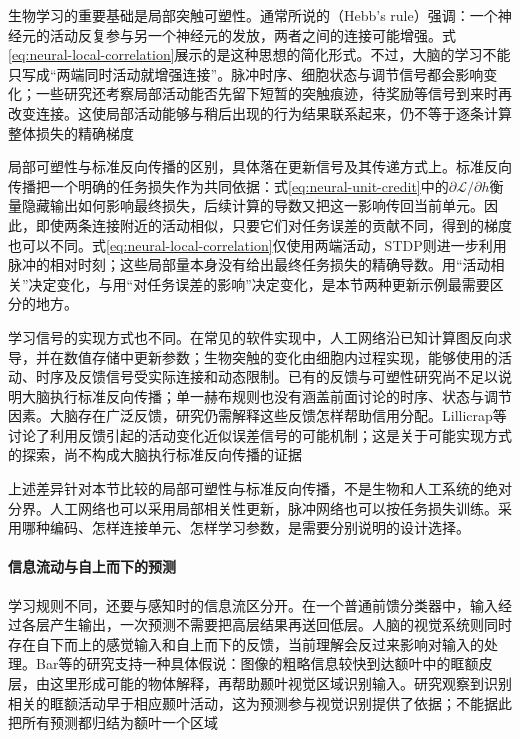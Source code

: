 生物学习的重要基础是局部突触可塑性。通常所说的（Hebb's rule）强调：一个神经元的活动反复参与另一个神经元的发放，两者之间的连接可能增强。式\eqref{eq:neural-local-correlation}展示的是这种思想的简化形式。不过，大脑的学习不能只写成“两端同时活动就增强连接”。脉冲时序、细胞状态与调节信号都会影响变化；一些研究还考察局部活动能否先留下短暂的突触痕迹，待奖励等信号到来时再改变连接。这使局部活动能够与稍后出现的行为结果联系起来，仍不等于逐条计算整体损失的精确梯度

局部可塑性与标准反向传播的区别，具体落在更新信号及其传递方式上。标准反向传播把一个明确的任务损失作为共同依据：式\eqref{eq:neural-unit-credit}中的$\partial\mathcal{L}/\partial h$衡量隐藏输出如何影响最终损失，后续计算的导数又把这一影响传回当前单元。因此，即使两条连接附近的活动相似，只要它们对任务误差的贡献不同，得到的梯度也可以不同。式\eqref{eq:neural-local-correlation}仅使用两端活动，STDP则进一步利用脉冲的相对时刻；这些局部量本身没有给出最终任务损失的精确导数。用“活动相关”决定变化，与用“对任务误差的影响”决定变化，是本节两种更新示例最需要区分的地方。

学习信号的实现方式也不同。在常见的软件实现中，人工网络沿已知计算图反向求导，并在数值存储中更新参数；生物突触的变化由细胞内过程实现，能够使用的活动、时序及反馈信号受实际连接和动态限制。已有的反馈与可塑性研究尚不足以说明大脑执行标准反向传播；单一赫布规则也没有涵盖前面讨论的时序、状态与调节因素。大脑存在广泛反馈，研究仍需解释这些反馈怎样帮助信用分配。Lillicrap等讨论了利用反馈引起的活动变化近似误差信号的可能机制；这是关于可能实现方式的探索，尚不构成大脑执行标准反向传播的证据

上述差异针对本节比较的局部可塑性与标准反向传播，不是生物和人工系统的绝对分界。人工网络也可以采用局部相关性更新，脉冲网络也可以按任务损失训练。采用哪种编码、怎样连接单元、怎样学习参数，是需要分别说明的设计选择。

\paragraph{信息流动与自上而下的预测}
学习规则不同，还要与感知时的信息流区分开。在一个普通前馈分类器中，输入经过各层产生输出，一次预测不需要把高层结果再送回低层。人脑的视觉系统则同时存在自下而上的感觉输入和自上而下的反馈，当前理解会反过来影响对输入的处理。Bar等的研究支持一种具体假说：图像的粗略信息较快到达额叶中的眶额皮层，由这里形成可能的物体解释，再帮助颞叶视觉区域识别输入。研究观察到识别相关的眶额活动早于相应颞叶活动，这为预测参与视觉识别提供了依据；不能据此把所有预测都归结为额叶一个区域

